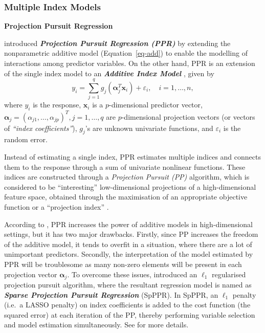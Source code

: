\documentclass[11pt,a4paper,]{article}
\begin{document}
\hypertarget{sec-multi-index}{%
\subsubsection{Multiple Index Models}\label{sec-multi-index}}

\textbf{Projection Pursuit Regression}

\textcite{Friedman1981} introduced \textbf{\emph{Projection Pursuit
Regression (PPR)}} by extending the nonparametric additive model
(Equation~\ref{eq-add}) to enable the modelling of interactions among
predictor variables. On the other hand, PPR is an extension of the
single index model to an \textbf{\emph{Additive Index Model }}, given by
\[
  y_{i} = \sum_{j=1}^{q} {g_{j}(\bm{\alpha}_{j}^{T}\bm{x}_{i})} + \varepsilon_{i}, \quad i = 1, \dots, n,
\] where \(y_{i}\) is the response, \(\bm{x}_{i}\) is a
\(p\)-dimensional predictor vector,
\(\bm{\alpha}_{j} = \left ( \alpha_{j1}, \dots, \alpha_{jp} \right )^{T}, j = 1, \dots, q\)
are \(p\)-dimensional projection vectors (or vectors of \emph{``index
coefficients''}), \(g_{j}\)'s are unknown univariate functions, and
\(\varepsilon_{i}\) is the random error.

Instead of estimating a single index, PPR estimates multiple indices and
connects them to the response through a sum of univariate nonlinear
functions. These indices are constructed through a \emph{Projection
Pursuit (PP)} \autocite{Kruskal1969,Friedman1974} algorithm, which is
considered to be ``interesting'' low-dimensional projections of a
high-dimensional feature space, obtained through the maximisation of an
appropriate objective function or a ``projection index''
\autocite{Huber1985}.

According to \textcite{Zhang2008}, PPR increases the power of additive
models in high-dimensional settings, but it has two major drawbacks.
Firstly, since PP increases the freedom of the additive model, it tends
to overfit in a situation, where there are a lot of unimportant
predictors. Secondly, the interpretation of the model estimated by PPR
will be troublesome as many non-zero elements will be present in each
projection vector \(\bm{\alpha}_{j}\). To overcome these issues,
\textcite{Zhang2008} introduced an \(\ell_{1}\) regularised projection
pursuit algorithm, where the resultant regression model is named as
\textbf{\emph{Sparse Projection Pursuit Regression}} (SpPPR). In SpPPR,
an \(\ell_{1}\) penalty (i.e.~a LASSO penalty) on index coefficients is
added to the cost function (the squared error) at each iteration of the
PP, thereby performing variable selection and model estimation
simultaneously. See \textcite{Zhang2008} for more details.
\end{document}
